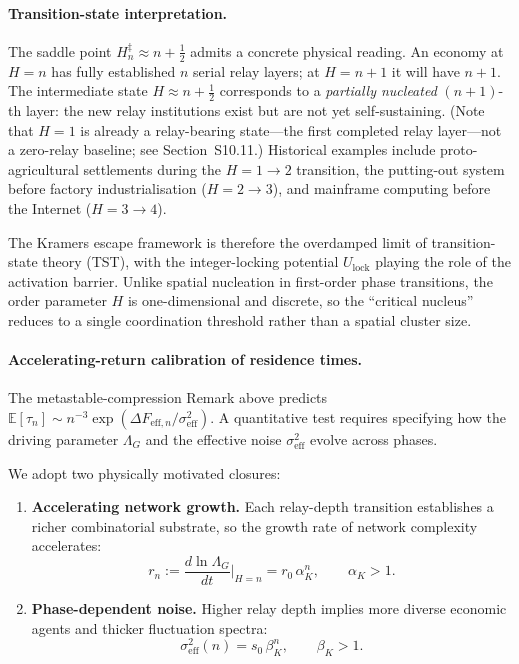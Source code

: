 \documentclass[11pt]{article}
\begin{document}
\paragraph{Transition-state interpretation.}
The saddle point $H_n^{\ddagger} \approx n + \tfrac{1}{2}$ admits a
concrete physical reading.  An economy at $H = n$ has fully
established $n$ serial relay layers; at $H = n{+}1$ it will have
$n{+}1$.  The intermediate state $H \approx n + \tfrac{1}{2}$
corresponds to a \emph{partially nucleated} $(n{+}1)$-th layer:
the new relay institutions exist but are not yet self-sustaining.
(Note that $H=1$ is already a relay-bearing state---the first completed
relay layer---not a zero-relay baseline; see Section~S10.11.)
Historical examples include proto-agricultural settlements during the
$H = 1 \to 2$ transition, the putting-out system before factory
industrialisation ($H = 2 \to 3$), and mainframe computing before
the Internet ($H = 3 \to 4$).

The Kramers escape framework is therefore the overdamped limit of
transition-state theory (TST), with the integer-locking potential
$U_{\mathrm{lock}}$ playing the role of the activation barrier.
Unlike spatial nucleation in first-order phase transitions, the
order parameter $H$ is one-dimensional and discrete, so the
``critical nucleus'' reduces to a single coordination threshold
rather than a spatial cluster size.

\paragraph{Accelerating-return calibration of residence times.}
The metastable-compression Remark above predicts
$\mathbb{E}[\tau_n] \sim n^{-3}\exp(\Delta F_{\mathrm{eff},n}/\sigma_{\mathrm{eff}}^2)$.
A quantitative test requires specifying how the driving parameter
$\Lambda_G$ and the effective noise $\sigma_{\mathrm{eff}}^2$ evolve
across phases.

We adopt two physically motivated closures:
\begin{enumerate}
\item \textbf{Accelerating network growth.}
Each relay-depth transition establishes a richer combinatorial
substrate, so the growth rate of network complexity accelerates:
\begin{equation}
r_n := \frac{d\ln\Lambda_G}{dt}\bigg|_{H=n}
= r_0\,\alpha_K^n, \qquad \alpha_K > 1.
\label{eq:accel_growth}
\end{equation}

\item \textbf{Phase-dependent noise.}
Higher relay depth implies more diverse economic agents and thicker
fluctuation spectra:
\begin{equation}
\sigma_{\mathrm{eff}}^2(n) = s_0\,\beta_K^n, \qquad \beta_K > 1.
\label{eq:phase_noise}
\end{equation}
\end{enumerate}
\end{document}
